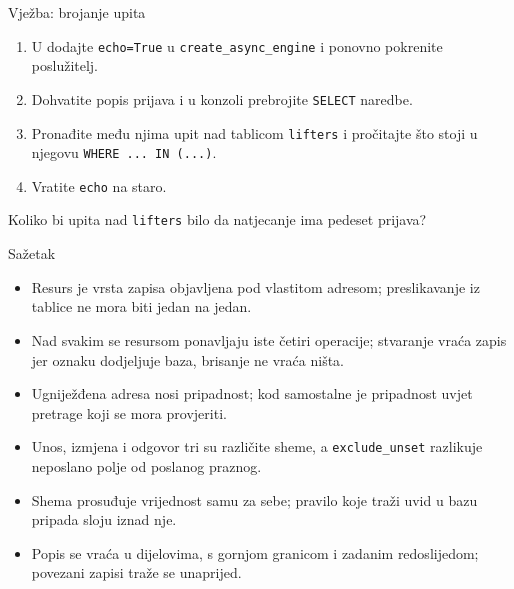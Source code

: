 \begin{frame}{Vježba: brojanje upita}
\begin{enumerate}
  \itemsep0.5em
  \item U  dodajte \texttt{echo=True} u \texttt{create\_async\_engine} i ponovno pokrenite poslužitelj.
  \item Dohvatite popis prijava i u konzoli prebrojite \texttt{SELECT} naredbe.
  \item Pronađite među njima upit nad tablicom \texttt{lifters} i pročitajte što stoji u njegovu \texttt{WHERE ... IN (...)}.
  \item Vratite \texttt{echo} na staro.
\end{enumerate}

\vspace{1.1em}
Koliko bi upita nad \texttt{lifters} bilo da natjecanje ima pedeset prijava?
\end{frame}

\begin{frame}{Sažetak}

\begin{itemize}
  \item Resurs je vrsta zapisa objavljena pod vlastitom adresom; preslikavanje iz tablice ne mora biti jedan na jedan.
  \item Nad svakim se resursom ponavljaju iste četiri operacije; stvaranje vraća zapis jer oznaku dodjeljuje baza, brisanje ne vraća ništa.
  \item Ugniježđena adresa nosi pripadnost; kod samostalne je pripadnost uvjet pretrage koji se mora provjeriti.
  \item Unos, izmjena i odgovor tri su različite sheme, a \texttt{exclude\_unset} razlikuje neposlano polje od poslanog praznog.
  \item Shema prosuđuje vrijednost samu za sebe; pravilo koje traži uvid u bazu pripada sloju iznad nje.
  \item Popis se vraća u dijelovima, s gornjom granicom i zadanim redoslijedom; povezani zapisi traže se unaprijed.
\end{itemize}
\end{frame}


